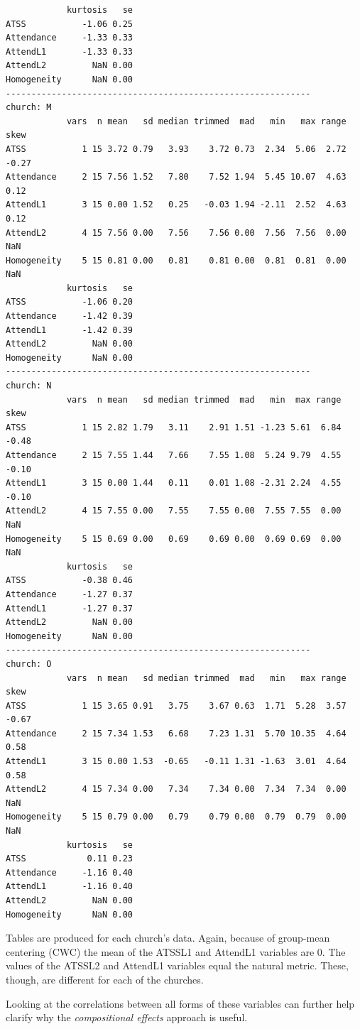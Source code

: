 \documentclass[
  11pt,
]{book}
\begin{document}
\begin{verbatim}
            kurtosis   se
ATSS           -1.06 0.25
Attendance     -1.33 0.33
AttendL1       -1.33 0.33
AttendL2         NaN 0.00
Homogeneity      NaN 0.00
------------------------------------------------------------ 
church: M
            vars  n mean   sd median trimmed  mad   min   max range  skew
ATSS           1 15 3.72 0.79   3.93    3.72 0.73  2.34  5.06  2.72 -0.27
Attendance     2 15 7.56 1.52   7.80    7.52 1.94  5.45 10.07  4.63  0.12
AttendL1       3 15 0.00 1.52   0.25   -0.03 1.94 -2.11  2.52  4.63  0.12
AttendL2       4 15 7.56 0.00   7.56    7.56 0.00  7.56  7.56  0.00   NaN
Homogeneity    5 15 0.81 0.00   0.81    0.81 0.00  0.81  0.81  0.00   NaN
            kurtosis   se
ATSS           -1.06 0.20
Attendance     -1.42 0.39
AttendL1       -1.42 0.39
AttendL2         NaN 0.00
Homogeneity      NaN 0.00
------------------------------------------------------------ 
church: N
            vars  n mean   sd median trimmed  mad   min  max range  skew
ATSS           1 15 2.82 1.79   3.11    2.91 1.51 -1.23 5.61  6.84 -0.48
Attendance     2 15 7.55 1.44   7.66    7.55 1.08  5.24 9.79  4.55 -0.10
AttendL1       3 15 0.00 1.44   0.11    0.01 1.08 -2.31 2.24  4.55 -0.10
AttendL2       4 15 7.55 0.00   7.55    7.55 0.00  7.55 7.55  0.00   NaN
Homogeneity    5 15 0.69 0.00   0.69    0.69 0.00  0.69 0.69  0.00   NaN
            kurtosis   se
ATSS           -0.38 0.46
Attendance     -1.27 0.37
AttendL1       -1.27 0.37
AttendL2         NaN 0.00
Homogeneity      NaN 0.00
------------------------------------------------------------ 
church: O
            vars  n mean   sd median trimmed  mad   min   max range  skew
ATSS           1 15 3.65 0.91   3.75    3.67 0.63  1.71  5.28  3.57 -0.67
Attendance     2 15 7.34 1.53   6.68    7.23 1.31  5.70 10.35  4.64  0.58
AttendL1       3 15 0.00 1.53  -0.65   -0.11 1.31 -1.63  3.01  4.64  0.58
AttendL2       4 15 7.34 0.00   7.34    7.34 0.00  7.34  7.34  0.00   NaN
Homogeneity    5 15 0.79 0.00   0.79    0.79 0.00  0.79  0.79  0.00   NaN
            kurtosis   se
ATSS            0.11 0.23
Attendance     -1.16 0.40
AttendL1       -1.16 0.40
AttendL2         NaN 0.00
Homogeneity      NaN 0.00
\end{verbatim}

Tables are produced for each church's data. Again, because of group-mean centering (CWC) the mean of the ATSSL1 and AttendL1 variables are 0. The values of the ATSSL2 and AttendL1 variables equal the natural metric. These, though, are different for each of the churches.

Looking at the correlations between all forms of these variables can further help clarify why the \emph{compositional effects} approach is useful.
\end{document}

